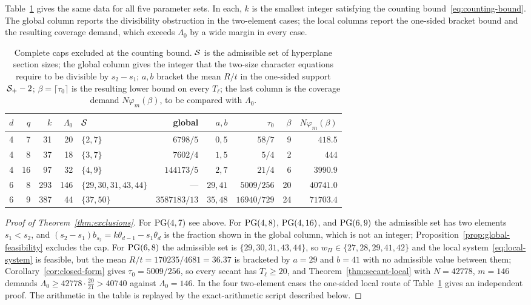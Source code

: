 Table~\ref{tab:cases} gives the same data for all five parameter sets.
In each, \(k\) is the smallest integer satisfying the counting
bound~\eqref{eq:counting-bound}.  The global column reports the
divisibility obstruction in the two-element cases; the local columns
report the one-sided bracket bound and the resulting coverage demand,
which exceeds \(\Lambda_0\) by a wide margin in every case.

\begin{table}[ht]
\centering
\caption{Complete caps excluded at the counting bound.  \(\mathcal S\) is the
admissible set of hyperplane section sizes; the global column gives the
integer that the two-size character equations require to be divisible by
\(s_2-s_1\); \(a,b\) bracket the mean \(R/t\) in the one-sided support
\(\mathcal S_+-2\); \(\beta=\lceil\tau_0\rceil\) is the resulting lower bound on
every \(T_\ell\); the last column is the coverage demand
\(N\varphi_m(\beta)\), to be compared with \(\Lambda_0\).}
\label{tab:cases}
\small
\begin{tabular}{@{}rrrrlrrrrr@{}}
\toprule
\(d\) & \(q\) & \(k\) & \(\Lambda_0\) & \(\mathcal S\) & global & \(a,b\) & \(\tau_0\) & \(\beta\) & \(N\varphi_m(\beta)\)\\
\midrule
4 & 7  & 31  & 20  & \(\{2,7\}\)              & \(6798/5\)     & \(0,5\)   & \(58/7\)      & 9  & \(418.5\)\\
4 & 8  & 37  & 18  & \(\{3,7\}\)              & \(7602/4\)     & \(1,5\)   & \(5/4\)       & 2  & \(444\)\\
4 & 16 & 97  & 32  & \(\{4,9\}\)              & \(144173/5\)   & \(2,7\)   & \(21/4\)      & 6  & \(3990.9\)\\
6 & 8  & 293 & 146 & \(\{29,30,31,43,44\}\)   & ---            & \(29,41\) & \(5009/256\)  & 20 & \(40741.0\)\\
6 & 9  & 387 & 44  & \(\{37,50\}\)            & \(3587183/13\) & \(35,48\) & \(16940/729\) & 24 & \(71703.4\)\\
\bottomrule
\end{tabular}
\end{table}

\begin{proof}[Proof of Theorem~\ref{thm:exclusions}]
For \(\mathrm{PG}(4,7)\) see above.  For \(\mathrm{PG}(4,8)\), \(\mathrm{PG}(4,16)\), and
\(\mathrm{PG}(6,9)\) the admissible set has two elements \(s_1<s_2\), and
\((s_2-s_1)b_{s_2}=k\theta_{d-1}-s_1\theta_d\) is the fraction shown in the
global column, which is not an integer; Proposition~\ref{prop:global-feasibility}
excludes the cap.  For \(\mathrm{PG}(6,8)\) the admissible set is
\(\{29,30,31,43,44\}\), so \(w_\Pi\in\{27,28,29,41,42\}\) and the local
system~\eqref{eq:local-system} is feasible, but the mean
\(R/t=170235/4681=36.37\) is bracketed by \(a=29\) and \(b=41\) with no
admissible value between them;
Corollary~\ref{cor:closed-form} gives \(\tau_0=5009/256\), so every
secant has \(T_\ell\ge20\), and Theorem~\ref{thm:secant-local} with
\(N=42778\), \(m=146\) demands \(\Lambda_0\ge42778\cdot\tfrac{20}{21}>40740\)
against \(\Lambda_0=146\).  In the four two-element cases the one-sided
local route of Table~\ref{tab:cases} gives an independent proof.  The
arithmetic in the table is replayed by the exact-arithmetic script
described below.
\end{proof}

